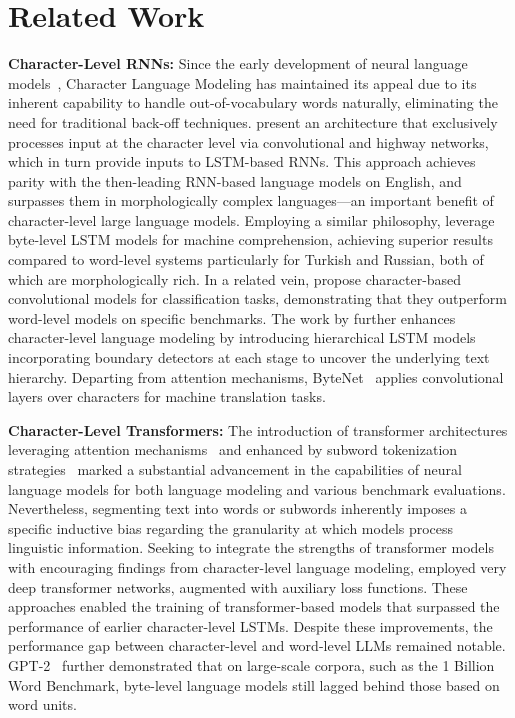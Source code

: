 \section{Related Work}
\label{section:related_work}

\textbf{Character-Level RNNs:} Since the early development of neural language models~\citep{sutskever2011generating, mikolov2012subword, graves2013generating}, Character Language Modeling has maintained its appeal due to its inherent capability to handle out-of-vocabulary words naturally, eliminating the need for traditional back-off techniques. \cite{kim2016character} present an architecture that exclusively processes input at the character level via convolutional and highway networks, which in turn provide inputs to LSTM-based RNNs. This approach achieves parity with the then-leading RNN-based language models on English, and surpasses them in morphologically complex languages—an important benefit of character-level large language models. Employing a similar philosophy, \cite{kenter2018byte} leverage byte-level LSTM models for machine comprehension, achieving superior results compared to word-level systems particularly for Turkish and Russian, both of which are morphologically rich. In a related vein, \cite{zhang2015character} propose character-based convolutional models for classification tasks, demonstrating that they outperform word-level models on specific benchmarks. The work by \citet{chung2019hierarchical} further enhances character-level language modeling by introducing hierarchical LSTM models incorporating boundary detectors at each stage to uncover the underlying text hierarchy. Departing from attention mechanisms, ByteNet~\citep{kalchbrenner2016neural} applies convolutional layers over characters for machine translation tasks.

\textbf{Character-Level Transformers:} The introduction of transformer architectures leveraging attention mechanisms~\citep{vaswani2017attention} and enhanced by subword tokenization strategies~\citep{sennrich-etal-2016-neural} marked a substantial advancement in the capabilities of neural language models for both language modeling and various benchmark evaluations. Nevertheless, segmenting text into words or subwords inherently imposes a specific inductive bias regarding the granularity at which models process linguistic information. Seeking to integrate the strengths of transformer models with encouraging findings from character-level language modeling, \citet{al2019character} employed very deep transformer networks, augmented with auxiliary loss functions. These approaches enabled the training of transformer-based models that surpassed the performance of earlier character-level LSTMs. Despite these improvements, the performance gap between character-level and word-level LLMs remained notable. GPT-2~\citep{radfordgpt2} further demonstrated that on large-scale corpora, such as the 1 Billion Word Benchmark, byte-level language models still lagged behind those based on word units.

